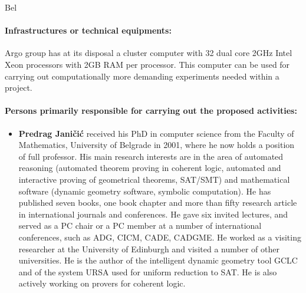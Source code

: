 \begin{sitedescription}{Bel}
  \paragraph{Infrastructures or technical equipments:}

  \begin{compactitem}
  \item Argo group has at its disposal a cluster computer with 32 dual core
  2GHz Intel Xeon processors with 2GB RAM per processor. This computer
  can be used for carrying out computationally more demanding
  experiments needed within a project.
  \end{compactitem}
  
  \paragraph{Persons primarily responsible for carrying out the proposed activities:}
  
  \begin{itemize} %
    
  \item{\bf Predrag Janičić} received his PhD in computer science from
    the Faculty of Mathematics, University of Belgrade in 2001, where
    he now holds a position of full professor. His main research
    interests are in the area of automated reasoning (automated
    theorem proving in coherent logic, automated and interactive
    proving of geometrical theorems, SAT/SMT) and mathematical
    software (dynamic geometry software, symbolic computation). He has
    published seven books, one book chapter and more than fifty
    research article in international journals and conferences. He
    gave six invited lectures, and served as a PC chair or a PC member
    at a number of international conferences, such as ADG, CICM, CADE,
    CADGME. He worked as a visiting researcher at the University of
    Edinburgh and visited a number of other universities. He is the
    author of the intelligent dynamic geometry tool GCLC and of the
    system URSA used for uniform reduction to SAT. He is also actively
    working on provers for coherent logic.


\end{itemize}
\end{sitedescription}
